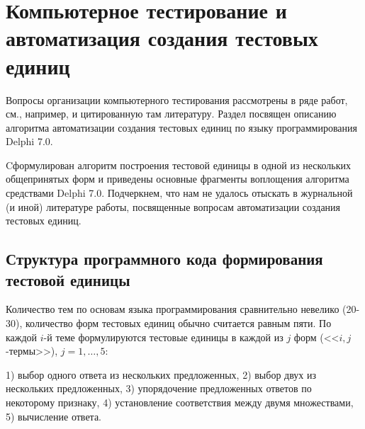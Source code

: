 ﻿\chapter{Компьютерное тестирование и автоматизация создания тестовых единиц}\label{akm2-chap}





Вопросы организации компьютерного тестирования рассмотрены в ряде работ, см., например, \cite{akm_Lapt} и цитированную там литературу. Раздел посвящен описанию алгоритма автоматизации создания тестовых единиц по языку программирования Delphi 7.0.


Cформулирован алгоритм построения тестовой единицы в одной из нескольких общепринятых форм и приведены основные фрагменты воплощения алгоритма средствами Delphi 7.0. Подчеркнем, что нам не удалось отыскать в журнальной (и иной) литературе работы, посвященные вопросам автоматизации создания тестовых единиц.



\section{Структура программного кода формирования тестовой единицы}

Количество тем по основам языка программирования сравнительно невелико (20-30), количество форм тестовых единиц обычно считается равным пяти. По каждой $i$-й теме формулируются тестовые единицы в каждой из $j$ форм (<<$i,j$-термы>>), $j=1,\dots,5$:


1) выбор одного ответа из нескольких предложенных, 2) выбор двух из нескольких предложенных, 3) упорядочение предложенных ответов по некоторому признаку, 4) установление соответствия между двумя множествами, 5) вычисление ответа.


